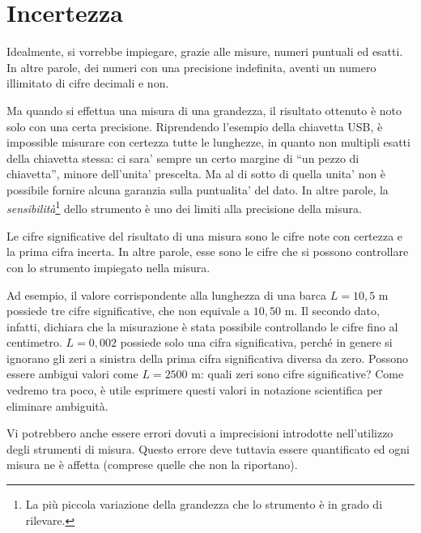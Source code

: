 \section{Incertezza}
Idealmente, si vorrebbe impiegare, grazie alle misure, numeri puntuali ed esatti.
In altre parole, dei numeri con una precisione indefinita, aventi un numero
illimitato di cifre decimali e non.

Ma quando si effettua una misura di una grandezza, il risultato ottenuto è noto solo
con una certa precisione. Riprendendo l'esempio della chiavetta USB, è impossible
misurare con certezza tutte le lunghezze, in quanto non multipli esatti della
chiavetta stessa: ci sara' sempre un certo margine di ``un pezzo di chiavetta'',
minore dell'unita' prescelta. Ma al di sotto di quella unita' non è possibile
fornire alcuna garanzia sulla puntualita' del dato. In altre parole, la
\textit{sensibilità}\footnote{La più piccola variazione della grandezza che lo
strumento è in grado di rilevare.} dello strumento è uno dei limiti alla precisione
della misura.

\vspace{8pt}
\begin{tcolorbox}[colback = yellow!30, colframe = yellow!30!black, title = {Cifre significative del risultato di una misura}]
Le cifre significative del risultato di una misura sono le cifre note
con certezza e la prima cifra incerta. In altre parole, esse sono le cifre che si
possono controllare con lo strumento impiegato nella misura.
\end{tcolorbox}
\vspace{5pt}

Ad esempio, il valore corrispondente alla lunghezza di una barca $L = 10,5$ m
possiede tre cifre significative, che non equivale a $10,50$ m. Il secondo dato,
infatti, dichiara che la misurazione è stata possibile controllando le cifre
fino al centimetro. $L = 0,002$ possiede solo una cifra significativa, perché
in genere si ignorano gli zeri a sinistra della prima cifra significativa diversa
da zero. Possono essere ambigui valori come $L = 2500 \text{ m}$: quali zeri sono
cifre significative? Come vedremo tra poco, è utile esprimere questi valori in
notazione scientifica per eliminare ambiguità.

Vi potrebbero anche essere errori dovuti a imprecisioni introdotte nell'utilizzo
degli strumenti di misura. Questo errore deve tuttavia essere quantificato ed ogni
misura ne è affetta (comprese quelle che non la riportano).

